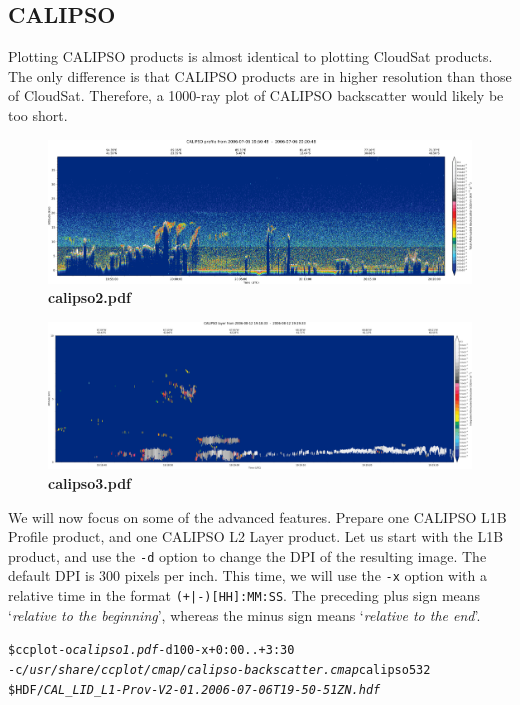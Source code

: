 \subsection{CALIPSO}

\noindent Plotting CALIPSO products is almost identical to plotting CloudSat
products. The only difference is that CALIPSO products are in higher resolution
than those of CloudSat. Therefore, a 1000-ray plot of CALIPSO backscatter would
likely be too short.

\begin{figure}[t]
\includegraphics[width=\textwidth]{images/calipso2.pdf}
\caption[calipso2.pdf]{\textbf{calipso2.pdf}}
\label{fig:calipso2}
\end{figure}

\begin{figure}[t]
\includegraphics[width=\textwidth]{images/calipso3.pdf}
\caption[calipso3.pdf]{\textbf{calipso3.pdf}}
\label{fig:calipso3}
\end{figure}

We will now focus on some of the advanced features. Prepare one CALIPSO
L1B Profile product, and one CALIPSO L2 Layer product. Let us start with the L1B
product, and use the \texttt{-d} option to change the DPI of the resulting
image. The default DPI is 300 pixels per inch. This time, we will use the
\texttt{-x} option with a relative time in the format \texttt{(+|-)[HH]:MM:SS}.
The preceding plus sign means `\textit{relative to the beginning}', whereas the minus
sign means `\textit{relative to the end}'.

\begin{alltt}
\$ ccplot -o \textit{calipso1.pdf} -d 100 -x +0:00..+3:30
-c \textit{/usr/share/ccplot/cmap/calipso-backscatter.cmap} calipso532
\$HDF/\textit{CAL_LID_L1-Prov-V2-01.2006-07-06T19-50-51ZN.hdf}
\end{alltt}



